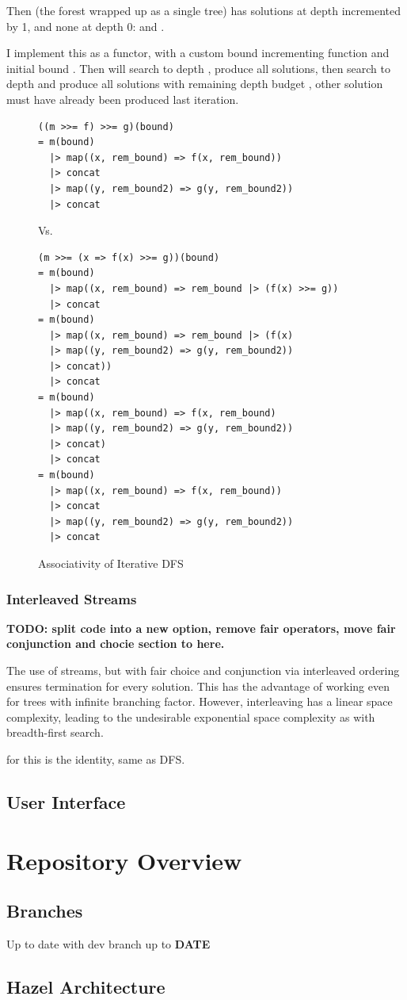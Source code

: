 Then  (the forest  wrapped up as a single tree) has solutions at depth incremented by 1, and none at depth 0:  and .

I implement this as a functor, with a custom bound incrementing function  and initial bound . Then  will   search to depth , produce all solutions, then search to depth  and produce all solutions with remaining depth budget , other solution must have already been produced last iteration.

\begin{figure}
\begin{verbatim}
((m >>= f) >>= g)(bound)
= m(bound) 
  |> map((x, rem_bound) => f(x, rem_bound))
  |> concat
  |> map((y, rem_bound2) => g(y, rem_bound2))
  |> concat
\end{verbatim}
Vs.
\begin{verbatim}
(m >>= (x => f(x) >>= g))(bound)
= m(bound)
  |> map((x, rem_bound) => rem_bound |> (f(x) >>= g))
  |> concat
= m(bound)
  |> map((x, rem_bound) => rem_bound |> (f(x) 
  |> map((y, rem_bound2) => g(y, rem_bound2)) 
  |> concat))
  |> concat
= m(bound)
  |> map((x, rem_bound) => f(x, rem_bound) 
  |> map((y, rem_bound2) => g(y, rem_bound2))
  |> concat)
  |> concat
= m(bound)
  |> map((x, rem_bound) => f(x, rem_bound)) 
  |> concat
  |> map((y, rem_bound2) => g(y, rem_bound2))
  |> concat
\end{verbatim}
\caption{Associativity of Iterative DFS }
\end{figure}

\subsubsection{Interleaved Streams}
\textbf{TODO: split code into a new option, remove fair operators, move fair conjunction and chocie section to here.}

The use of streams, but with fair choice and conjunction via interleaved ordering ensures termination for every solution. This has the advantage of working even for trees with infinite branching factor. However, interleaving has a linear space complexity, leading to the undesirable exponential space complexity as with breadth-first search.

 for this is the identity, same as DFS.

\subsection{User Interface}

\section{Repository Overview}
\subsection{Branches}
Up to date with dev branch up to \textbf{DATE}

\subsection{Hazel Architecture}



